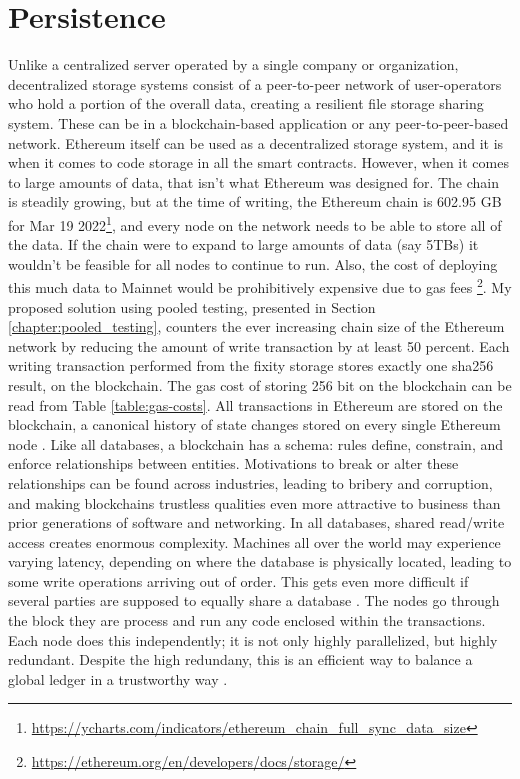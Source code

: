 \section{Persistence}
Unlike a centralized server operated by a single company or organization, decentralized storage systems consist of a peer-to-peer network of user-operators who hold a portion of the overall data, creating a resilient file storage sharing system. These can be in a blockchain-based application or any peer-to-peer-based network. Ethereum itself can be used as a decentralized storage system, and it is when it comes to code storage in all the smart contracts. However, when it comes to large amounts of data, that isn't what Ethereum was designed for. The chain is steadily growing, but at the time of writing, the Ethereum chain is 602.95 GB for Mar 19 2022\footnote{\url{https://ycharts.com/indicators/ethereum_chain_full_sync_data_size}}, and every node on the network needs to be able to store all of the data. If the chain were to expand to large amounts of data (say 5TBs) it wouldn't be feasible for all nodes to continue to run. Also, the cost of deploying this much data to Mainnet would be prohibitively expensive due to gas fees \footnote{\url{https://ethereum.org/en/developers/docs/storage/}}.
My proposed solution using pooled testing, presented in Section \ref{chapter:pooled_testing}, counters the ever increasing chain size of the Ethereum network by reducing the amount of write transaction by at least 50 percent. Each writing transaction performed from the fixity storage stores exactly one sha256 result, on the blockchain. The gas cost of storing 256 bit on the blockchain can be read from Table \ref{table:gas-costs}.
All transactions in Ethereum are stored on the blockchain, a canonical history of state changes stored on every single Ethereum node \cite[12]{dannen2017introducing}.
Like all databases, a blockchain has a schema: rules define, constrain, and enforce relationships between entities. Motivations to break or alter these relationships can be found across industries, leading to bribery and corruption, and making blockchains trustless qualities even more attractive to business than prior generations of software and networking. In all databases, shared read/write access creates enormous complexity. Machines all over the world may experience varying latency, depending on where the database is physically located, leading to some write operations arriving out of order. This gets even more difficult if several parties are supposed to equally share a database \cite[20]{dannen2017introducing}. 
The nodes go through the block they are process and run any code enclosed within the transactions. Each node does this independently; it is not only highly parallelized, but highly redundant. Despite the high redundany, this is an efficient way to balance a global ledger in a trustworthy way \cite[50]{dannen2017introducing}.
